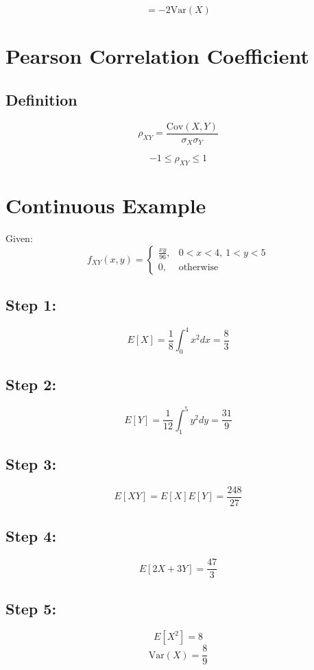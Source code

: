 \documentclass[11pt]{article}
\begin{document}
\[
= -2\text{Var}(X)
\]

\section{Pearson Correlation Coefficient}

\subsection{Definition}
\[
\rho_{XY} = \frac{\text{Cov}(X,Y)}{\sigma_X \sigma_Y}
\]

\[
-1 \le \rho_{XY} \le 1
\]

\section{Continuous Example}

Given:
\[
f_{XY}(x,y) =
\begin{cases}
\frac{xy}{96}, & 0<x<4,\ 1<y<5 \\
0, & \text{otherwise}
\end{cases}
\]

\subsection{Step 1:}
\[
E[X] = \frac{1}{8}\int_0^4 x^2 dx = \frac{8}{3}
\]

\subsection{Step 2:}
\[
E[Y] = \frac{1}{12}\int_1^5 y^2 dy = \frac{31}{9}
\]

\subsection{Step 3:}
\[
E[XY] = E[X]E[Y] = \frac{248}{27}
\]

\subsection{Step 4:}
\[
E[2X+3Y] = \frac{47}{3}
\]

\subsection{Step 5:}
\[
E[X^2] = 8
\]
\[
\text{Var}(X) = \frac{8}{9}
\]
\end{document}
